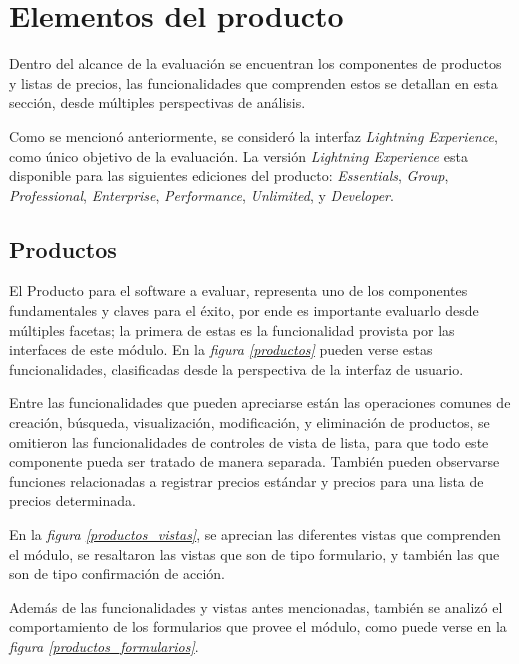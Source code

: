 \section{Elementos del producto}
Dentro del alcance de la evaluación se encuentran los componentes de productos
y listas de precios, las funcionalidades que comprenden estos se detallan en
esta sección, desde múltiples perspectivas de análisis.

Como se mencionó anteriormente, se consideró la interfaz
\emph{Lightning Experience}, como único objetivo de la evaluación. La versión
\emph{Lightning Experience} esta disponible para las siguientes ediciones del
producto: \emph{Essentials}, \emph{Group}, \emph{Professional},
\emph{Enterprise}, \emph{Performance}, \emph{Unlimited}, y \emph{Developer}.

\subsection{Productos}
El Producto para el software a evaluar, representa uno de los componentes
fundamentales y claves para el éxito, por ende es importante evaluarlo
desde múltiples facetas; la primera de estas es la funcionalidad provista por
las interfaces de este módulo. En la \emph{figura \ref{productos}} pueden verse
estas funcionalidades, clasificadas desde la perspectiva de la interfaz de
usuario.

Entre las funcionalidades que pueden apreciarse están las operaciones comunes
de creación, búsqueda, visualización, modificación, y eliminación de productos,
se omitieron las funcionalidades de controles de vista de lista, para que
todo este componente pueda ser tratado de manera separada. También pueden
observarse funciones relacionadas a registrar precios estándar y precios para
una lista de precios determinada.

En la \emph{figura \ref{productos_vistas}}, se aprecian las diferentes vistas
que comprenden el módulo, se resaltaron las vistas que son de tipo formulario,
y también las que son de tipo confirmación de acción.

Además de las funcionalidades y vistas antes mencionadas, también se analizó el
comportamiento de los formularios que provee el módulo, como puede verse en la
\emph{figura \ref{productos_formularios}}.

